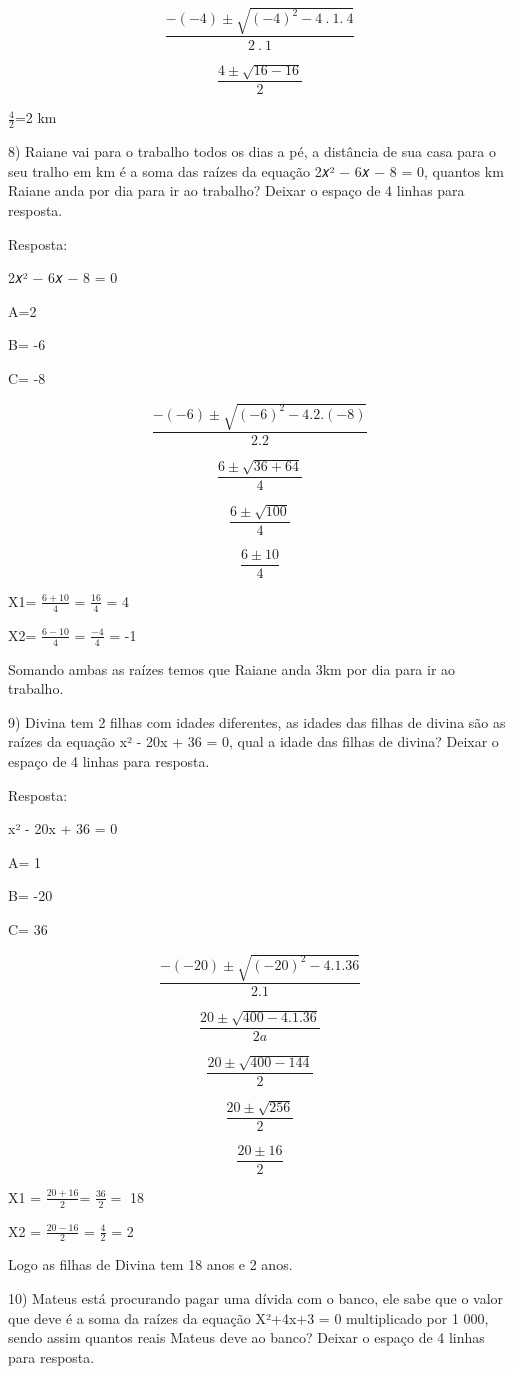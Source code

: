 \[\frac{- ( - 4) \pm \sqrt{{( - 4)}^{2} - 4\ .\ 1.\ 4}}{2\ .\ 1}\]

\[\frac{4 \pm \sqrt{16 - 16}}{2}\]

\(\frac{4}{2}\)=2 km

8) Raiane vai para o trabalho todos os dias a pé, a distância de sua
casa para o seu tralho em km é a soma das raízes da equação 2𝑥² − 6𝑥 − 8
= 0, quantos km Raiane anda por dia para ir ao trabalho? Deixar o espaço
de 4 linhas para resposta.

Resposta:

2𝑥² − 6𝑥 − 8 = 0

A=2

B= -6

C= -8

\[\frac{- ( - 6) \pm \sqrt{{( - 6)}^{2} - 4.2.( - 8)}}{2.2}\]

\[\frac{6 \pm \sqrt{36 + 64}}{4}\]

\[\frac{6 \pm \sqrt{100}}{4}\]

\[\frac{6 \pm 10}{4}\]

X1= \(\frac{6 + 10}{4}\) = \(\frac{16}{4}\) = 4

X2= \(\frac{6 - 10}{4}\) = \(\frac{- 4}{4}\) = -1

Somando ambas as raízes temos que Raiane anda 3km por dia para ir ao
trabalho.

9) Divina tem 2 filhas com idades diferentes, as idades das filhas de
divina são as raízes da equação x² - 20x + 36 = 0, qual a idade das
filhas de divina? Deixar o espaço de 4 linhas para resposta.

Resposta:

x² - 20x + 36 = 0

A= 1

B= -20

C= 36

\[\frac{- ( - 20) \pm \sqrt{{( - 20)}^{2} - 4.1.36}}{2.1}\]

\[\frac{20 \pm \sqrt{400 - 4.1.36}}{2a}\]

\[\frac{20 \pm \sqrt{400 - 144}}{2}\]

\[\frac{20 \pm \sqrt{256}}{2}\]

\[\frac{20 \pm 16}{2}\]

X1 = \(\frac{20 + 16}{2}\)= \(\frac{36}{2} =\) 18

X2 = \(\frac{20 - 16}{2}\) = \(\frac{4}{2}\) = 2

Logo as filhas de Divina tem 18 anos e 2 anos.

10) Mateus está procurando pagar uma dívida com o banco, ele sabe que o
valor que deve é a soma da raízes da equação X²+4x+3 = 0 multiplicado
por 1 000, sendo assim quantos reais Mateus deve ao banco? Deixar o
espaço de 4 linhas para resposta.

